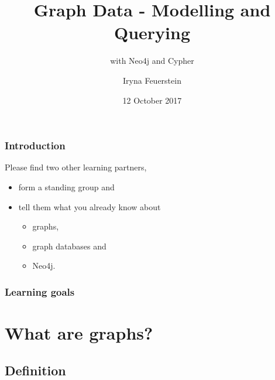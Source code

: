 \documentclass[12pt]{beamer}
\title{Graph Data - Modelling and Querying}
\subtitle{with Neo4j and Cypher}
\author[I.Feuerstein]{Iryna Feuerstein}
\institute[ODSC]{Open Data Science Conference}
\date{12 October 2017}
\begin{document}
    
    \begin{frame}
        \frametitle{Introduction}
        Please find two other learning partners, 
        \begin{itemize}
            \item form a standing group and 
            \item tell them what you already know about \begin{itemize}
                \item graphs, 
                \item graph databases and 
                \item Neo4j.
            \end{itemize}
        \end{itemize}
    \end{frame}
    
    \maketitle
    
    \begin{frame}
        \frametitle{Learning goals}
        \tableofcontents
    \end{frame}
    
    \section{What are graphs?}
    \subsection{Definition}
    
\end{document}
